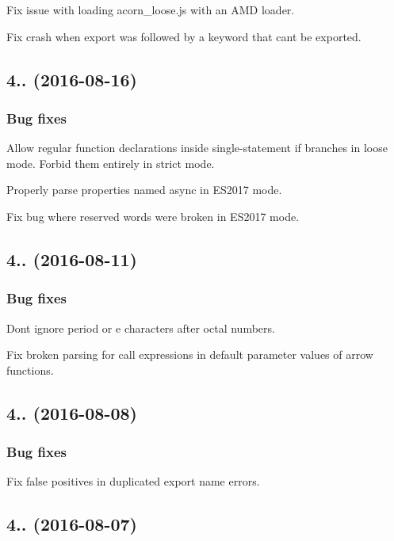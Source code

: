 Fix issue with loading acorn\+\_\+loose.\+js with an A\+MD loader.

Fix crash when {\ttfamily export} was followed by a keyword that can\textquotesingle{}t be exported.

\subsection*{4.. (2016-\/08-\/16)}

\subsubsection*{Bug fixes}

Allow regular function declarations inside single-\/statement {\ttfamily if} branches in loose mode. Forbid them entirely in strict mode.

Properly parse properties named {\ttfamily async} in E\+S2017 mode.

Fix bug where reserved words were broken in E\+S2017 mode.

\subsection*{4.. (2016-\/08-\/11)}

\subsubsection*{Bug fixes}

Don\textquotesingle{}t ignore period or \textquotesingle{}e\textquotesingle{} characters after octal numbers.

Fix broken parsing for call expressions in default parameter values of arrow functions.

\subsection*{4.. (2016-\/08-\/08)}

\subsubsection*{Bug fixes}

Fix false positives in duplicated export name errors.

\subsection*{4.. (2016-\/08-\/07)}

